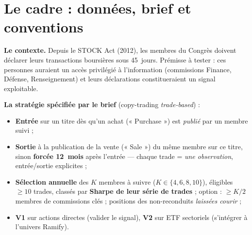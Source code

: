 \documentclass[11pt,a4paper]{article}
\begin{document}
\tableofcontents

\section{Le cadre : données, brief et conventions}\label{sec:donnees}

\textbf{Le contexte.} Depuis le STOCK Act (2012), les membres du Congrès doivent déclarer leurs
transactions boursières sous 45~jours. Prémisse à tester : ces personnes auraient un accès privilégié à
l'information (commissions Finance, Défense, Renseignement) et leurs déclarations constitueraient un
signal exploitable.

\textbf{La stratégie spécifiée par le brief} (copy-trading \emph{trade-based}) :
\begin{itemize}[leftmargin=1.4em,itemsep=1pt]
\item \textbf{Entrée} sur un titre dès qu'un achat (« Purchase ») est \emph{publié} par un membre suivi ;
\item \textbf{Sortie} à la publication de la vente (« Sale ») du même membre sur ce titre, sinon
      \textbf{forcée 12~mois} après l'entrée --- chaque trade = \emph{une observation}, entrée/sortie explicites ;
\item \textbf{Sélection annuelle} des $K$ membres à suivre ($K\in\{4,6,8,10\}$), éligibles $\geq10$
      trades, classés par \textbf{Sharpe de leur série de trades} ; option : $\geq K/2$ membres de
      commissions clés ; positions des non-reconduits \emph{laissées courir} ;
\item \textbf{V1} sur actions directes (valider le signal), \textbf{V2} sur ETF sectoriels (s'intégrer à
      l'univers Ramify).
\end{itemize}
\end{document}
